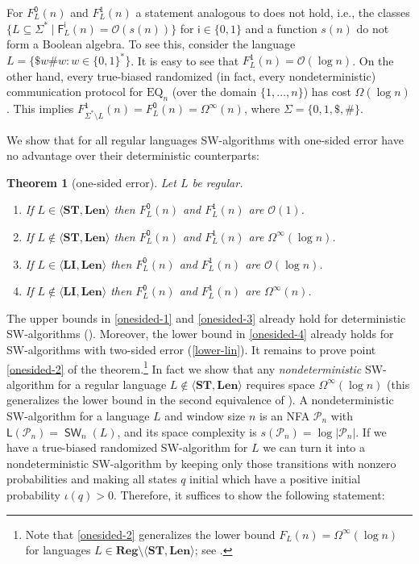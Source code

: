 \documentclass{article}\usepackage[a4paper,margin=20mm]{geometry}
\newtheorem{theorem}{Theorem}\newtheorem{lemma}[theorem]{Lemma}\newtheorem{proposition}[theorem]{Proposition}\newtheorem{corollary}[theorem]{Corollary}\newtheorem{definition}[theorem]{Definition}\newtheorem{claim}[theorem]{Claim}\newtheorem{remark}[theorem]{Remark}\newtheorem{observation}[theorem]{Observation}\newtheorem{conjecture}[theorem]{Conjecture}\newtheorem{example}[theorem]{Example}
\renewcommand{\O}{\mathcal{O}}
\renewcommand{\P}{\mathcal{P}}
\newcommand{\F}{\mathsf{F}}
\renewcommand{\L}{\mathsf{L}}
\DeclareMathOperator{\SW}{\mathsf{SW}}
\newcommand{\Reg}{\mathbf{Reg}}
\newcommand{\Len}{\mathbf{Len}}
\newcommand{\LI}{\mathbf{LI}}
\newcommand{\ST}{\mathbf{ST}}
\newcommand{\Omegainf}{\Omega^{\scriptscriptstyle{\infty}}}
\begin{document}
For $F^\mathsf{0}_L(n)$ and $F^\mathsf{1}_L(n)$ a statement analogous to  does not hold, i.e., 
the classes  $\{ L \subseteq \Sigma^* \mid \F^\mathsf{i}_L(n) = \O(s(n)) \}$ for $\mathsf{i} \in \{0,1\}$ and a function $s(n)$ do not
form a Boolean algebra. To see this, consider the language $L= \{ \$ w \# w : w \in \{0,1\}^*\}$. It is easy to see
that $F^\mathsf{1}_{L}(n) = \O(\log n)$. On the other hand, every true-biased randomized (in fact, every nondeterministic)
communication protocol for $\mathrm{EQ}_n$ (over the domain $\{1, \dots, n\}$) has cost $\Omega(\log n)$ \cite[Chapter~5]{Roughgarden16}. This implies
$F^\mathsf{1}_{\Sigma^* \setminus L}(n) = F^\mathsf{0}_{L}(n)  = \Omegainf(n)$, where $\Sigma= \{ 0,1,\$, \#\}$.


We show that for all regular languages
SW-algorithms with one-sided error have no advantage over their deterministic counterparts:
\begin{theorem}[one-sided error]
\label{thm:trichotomy-one-sided}
Let $L$ be regular.
\begin{enumerate}[label=(\roman{*}), ref=(\roman{*})]
	\item If $L \in \langle \ST, \Len \rangle$ then
	$F^\mathsf{0}_L(n)$ and $F^\mathsf{1}_L(n)$ are $\O(1)$. \label{onesided-1}
	\item If $L \notin \langle \ST, \Len \rangle$ then
	$F^\mathsf{0}_L(n)$ and $F^\mathsf{1}_L(n)$ are $\Omegainf(\log n)$. \label{onesided-2}
	\item If $L \in \langle \LI, \Len \rangle$ then
	$F^\mathsf{0}_L(n)$ and $F^\mathsf{1}_L(n)$ are $\O(\log n)$. \label{onesided-3}
	\item If $L \notin \langle \LI, \Len \rangle$ then
	$F^\mathsf{0}_L(n)$ and $F^\mathsf{1}_L(n)$ are $\Omegainf(n)$. \label{onesided-4}
\end{enumerate}
\end{theorem}
The upper bounds in \ref{onesided-1} and \ref{onesided-3} already hold
for deterministic SW-algorithms ().
Moreover, the lower bound in \ref{onesided-4} already holds for SW-algorithms with two-sided error
(\ref{lower-lin}).
It remains to prove point \ref{onesided-2} of the theorem.\footnote{Note that \eqref{onesided-2}
generalizes the lower bound $F_L(n) = \Omegainf(\log n)$ for languages $L  \in \Reg \setminus \langle \ST, \Len \rangle$; see .}
In fact we show that any {\em nondeterministic} SW-algorithm
for a regular language $L \notin \langle \ST, \Len \rangle$
requires space $\Omegainf(\log n)$ (this generalizes the lower bound in the second equivalence of ).
A nondeterministic SW-algorithm for a language $L$ and window size $n$ is an NFA $\P_n$
with $\L(\P_n) = \SW_n(L)$, and its space complexity is $s(\P_n) = \log |\P_n|$.
If we have a true-biased randomized SW-algorithm for $L$ we can turn it into a
nondeterministic SW-algorithm by keeping only those transitions with nonzero probabilities
and making all states $q$ initial which have a positive initial probability $\iota(q) > 0$.
Therefore, it suffices to show the following statement:
\end{document}

